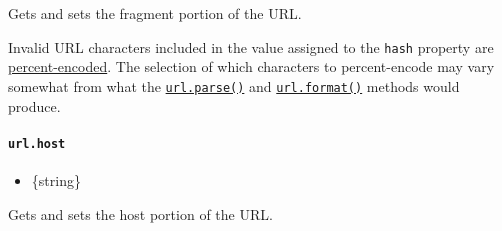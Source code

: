 Gets and sets the fragment portion of the URL.

\begin{Shaded}
\begin{Highlighting}[]
\OperatorTok{=}  \NormalTok{(}\NormalTok{)}\OperatorTok{;}
\NormalTok{)}\OperatorTok{;}

 \OperatorTok{=} \OperatorTok{;}
\NormalTok{)}\OperatorTok{;}
\end{Highlighting}
\end{Shaded}

Invalid URL characters included in the value assigned to the
\texttt{hash} property are
\hyperref[percent-encoding-in-urls]{percent-encoded}. The selection of
which characters to percent-encode may vary somewhat from what the
\hyperref[urlparseurlstring-parsequerystring-slashesdenotehost]{\texttt{url.parse()}}
and \hyperref[urlformaturlobject]{\texttt{url.format()}} methods would
produce.

\paragraph{\texorpdfstring{\texttt{url.host}}{url.host}}\label{url.host}

\begin{itemize}
\tightlist
\item
  \{string\}
\end{itemize}

Gets and sets the host portion of the URL.

\begin{Shaded}
\begin{Highlighting}[]
\OperatorTok{=}  \NormalTok{(}\NormalTok{)}\OperatorTok{;}
\NormalTok{)}\OperatorTok{;}

 \OperatorTok{=} \OperatorTok{;}
\NormalTok{)}\OperatorTok{;}
\end{Highlighting}
\end{Shaded}

